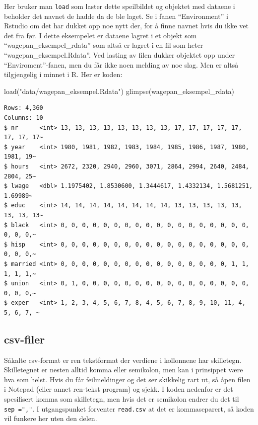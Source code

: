 \documentclass[
  norsk,
  letterpaper,
  DIV=11,
  numbers=noendperiod]{scrreprt}
\newenvironment{Shaded}{\begin{snugshade}}{\end{snugshade}}
\newcommand{\FunctionTok}[1]{\textcolor[rgb]{0.28,0.35,0.67}{#1}}
\newcommand{\NormalTok}[1]{\textcolor[rgb]{0.00,0.23,0.31}{#1}}
\newcommand{\StringTok}[1]{\textcolor[rgb]{0.13,0.47,0.30}{#1}}
\theoremstyle{definition}
\theoremstyle{remark}
\begin{document}
Her bruker man \texttt{load} som laster dette speilbildet og objektet
med dataene i beholder det navnet de hadde da de ble laget. Se i fanen
``Environment'' i Rstudio om det har dukket opp noe nytt der, for å
finne navnet hvis du ikke vet det fra før. I dette eksempelet er dataene
lagret i et objekt som ``wagepan\_eksempel\_rdata'' som altså er lagret
i en fil som heter ``wagepan\_eksempel.Rdata''. Ved lasting av filen
dukker objektet opp under ``Enviroment''-fanen, men du får ikke noen
melding av noe slag. Men er altså tilgjengelig i minnet i R. Her er
koden:

\begin{Shaded}
\begin{Highlighting}[]
\FunctionTok{load}\NormalTok{(}\StringTok{"data/wagepan\_eksempel.Rdata"}\NormalTok{)}
\FunctionTok{glimpse}\NormalTok{(wagepan\_eksempel\_rdata)}
\end{Highlighting}
\end{Shaded}

\begin{verbatim}
Rows: 4,360
Columns: 10
$ nr      <int> 13, 13, 13, 13, 13, 13, 13, 13, 17, 17, 17, 17, 17, 17, 17, 17~
$ year    <int> 1980, 1981, 1982, 1983, 1984, 1985, 1986, 1987, 1980, 1981, 19~
$ hours   <int> 2672, 2320, 2940, 2960, 3071, 2864, 2994, 2640, 2484, 2804, 25~
$ lwage   <dbl> 1.1975402, 1.8530600, 1.3444617, 1.4332134, 1.5681251, 1.69989~
$ educ    <int> 14, 14, 14, 14, 14, 14, 14, 14, 13, 13, 13, 13, 13, 13, 13, 13~
$ black   <int> 0, 0, 0, 0, 0, 0, 0, 0, 0, 0, 0, 0, 0, 0, 0, 0, 0, 0, 0, 0, 0,~
$ hisp    <int> 0, 0, 0, 0, 0, 0, 0, 0, 0, 0, 0, 0, 0, 0, 0, 0, 0, 0, 0, 0, 0,~
$ married <int> 0, 0, 0, 0, 0, 0, 0, 0, 0, 0, 0, 0, 0, 0, 0, 0, 1, 1, 1, 1, 1,~
$ union   <int> 0, 1, 0, 0, 0, 0, 0, 0, 0, 0, 0, 0, 0, 0, 0, 0, 0, 0, 0, 0, 0,~
$ exper   <int> 1, 2, 3, 4, 5, 6, 7, 8, 4, 5, 6, 7, 8, 9, 10, 11, 4, 5, 6, 7, ~
\end{verbatim}

\subsection{csv-filer}\label{csv-filer}

Såkalte csv-format er ren tekstformat der verdiene i kollonnene har
skilletegn. Skilletegnet er nesten alltid komma eller semikolon, men kan
i prinsippet være hva som helst. Hvis du får feilmeldinger og det ser
skikkelig rart ut, så åpen filen i Notepad (eller annet ren-tekst
program) og sjekk. I koden nedenfor er det spesifisert komma som
skilletegn, men hvis det er semikolon endrer du det til
\texttt{sep\ =","}. I utgangspunket forventer \texttt{read.csv} at det
er kommaseparert, så koden vil funkere her uten den delen.
\end{document}
